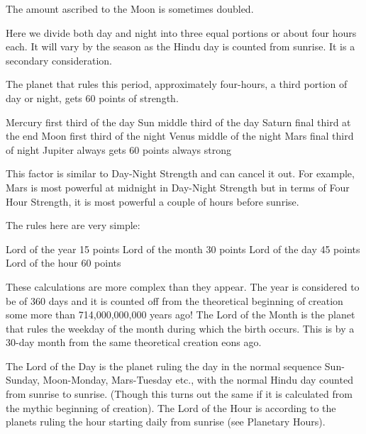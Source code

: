 The amount ascribed to the Moon is sometimes doubled.

 


 

Here we divide both day and night into three equal portions or about four hours each. It will vary by the season as the Hindu day is counted from sunrise. It is a secondary consideration.

The planet that rules this period, approximately four-hours, a third portion of day or night, gets 60 points of strength.

 

Mercury	  first third of the day	Sun	  middle third of the day
Saturn	  final third at the end	Moon	  first third of the night
Venus	  middle of the night	Mars	  final third of night
Jupiter	  always gets 60 points		always strong
 

This factor is similar to Day-Night Strength and can cancel it out. For example, Mars is most powerful at midnight in Day-Night Strength but in terms of Four Hour Strength, it is most powerful a couple of hours before sunrise.

 


 

The rules here are very simple:

 

Lord of the year	 15 points	Lord of the month	 30 points
Lord of the day	 45 points	Lord of the hour	 60 points
 

These calculations are more complex than they appear. The year is considered to be of 360 days and it is counted off from the theoretical beginning of creation some more than 714,000,000,000 years ago! The Lord of the Month is the planet that rules the weekday of the month during which the birth occurs. This is by a 30-day month from the same theoretical creation eons ago.

 

The Lord of the Day is the planet ruling the day in the normal sequence Sun-Sunday, Moon-Monday, Mars-Tuesday etc., with the normal Hindu day counted from sunrise to sunrise. (Though this turns out the same if it is calculated from the mythic beginning of creation). The Lord of the Hour is according to the planets ruling the hour starting daily from sunrise (see Planetary Hours).

 

